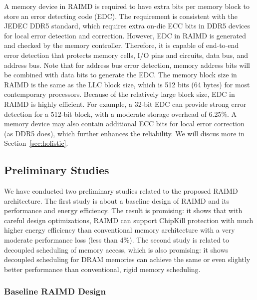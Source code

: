 \documentclass[11pt]{article}
\begin{document}
A memory device in RAIMD is required to have extra bits per memory block to
store an error detecting code (EDC).  The requirement is consistent with the
JEDEC DDR5 standard, which requires extra on-die ECC bits in DDR5 devices for
local error detection and correction.  However, EDC in RAIMD is generated and
checked by the memory controller.  Therefore, it is capable of end-to-end error
detection that protects memory cells, I/O pins and circuits, data bus, and
address bus.  Note that for address bus error detection, memory address bits
will be combined with data bits to generate the EDC.
The memory block size in RAIMD is the same as the LLC block size,
which is 512 bits (64 bytes) for most contemporary processors.  Because of the
relatively large block size, EDC in RAIMD is highly efficient.  For example, a
32-bit EDC can provide strong error detection for a 512-bit block, with a
moderate storage overhead of 6.25\%.  A memory device may also contain
additional ECC bits for local error correction (as DDR5 does), which further
enhances the reliability.  We will discus more in
Section~\ref{sec:holistic}.

\subsection{Preliminary Studies}

We have conducted two preliminary studies related to the proposed RAIMD
architecture.  The first study is about a baseline design of RAIMD and its
performance and energy efficiency.  The result is promising: it shows
that with careful design optimizations, RAIMD can support ChipKill protection
with much higher energy efficiency than conventional memory architecture with a
very moderate performance loss (less than 4\%).  The second study is related to
decoupled scheduling of memory access, which is also promising: it shows
decoupled scheduling for DRAM memories can achieve the same or even slightly
better performance than conventional, rigid memory scheduling.

\subsubsection{Baseline RAIMD Design}
\end{document}
